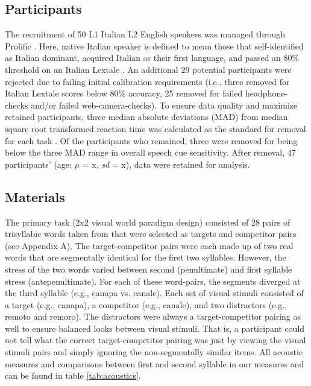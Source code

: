 
\subsection{Participants}
The recruitment of 50 L1 Italian L2 English speakers was managed through Prolific \citep{Palan_2018}. Here, native Italian speaker is defined to mean those that self-identified as Italian dominant, acquired Italian as their first language, and passed an 80\% threshold on an Italian Lextale \citep{Brown_Tusmagambet_Rahming_Tu_DeSalvo_Wiener_2023}. An additional 29 potential participants were rejected due to failing initial calibration requirements (i.e., three removed for Italian Lextale scores below 80\% accuracy, 25 removed for failed headphone-checks \citep{milne_2021} and/or failed web-camera-checks). To ensure data quality and maximize retained participants, three median absolute deviations (MAD) from median square root transformed reaction time was calculated as the standard for removal for each task \citep{Leys_2013}. Of the participants who remained, three were removed for being below the three MAD \cite{Leys_2013} range in overall speech cue sensitivity. After removal, 47 participants' (age: $\mu$ = x, \textit{sd} = x), data were retained for analysis. 

\subsection{Materials}

The primary task (2x2 visual world paradigm design) consisted of 28 pairs of trisyllabic words taken from \cite{Sulpizio_McQueen_2012} that were selected as targets and competitor pairs (see Appendix A). The target-competitor pairs were each made up of two real words that are segmentally identical for the first two syllables. However, the stress of the two words varied between second (penultimate) and first syllable stress (antepenultimate). For each of these word-pairs, the segments diverged at the third syllable (e.g., canapa vs. canale). Each set of visual stimuli consisted of a target (e.g., canapa), a competitor (e.g., canale), and two distractors (e.g., remoto and remoro). The distractors were always a target-competitor pairing as well to ensure balanced looks between visual stimuli. That is, a participant could not tell what the correct target-competitor pairing was just by viewing the visual stimuli pairs and simply ignoring the non-segmentally similar items. All acoustic measures and comparisons between first and second syllable in our measures and \cite{Sulpizio_McQueen_2012} can be found in table \ref{tab:acoustics}. 


